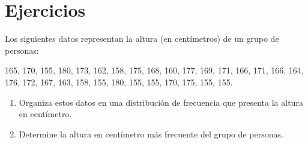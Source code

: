 \section{Ejercicios}

\begin{exercise}
    Los siguientes datos representan la altura (en centímetros) de un grupo de personas:
    
    165, 170, 155, 180, 173, 162, 158, 175, 168, 160, 177, 169, 171, 166, 171, 166, 164, 176, 172, 167, 163, 158, 155, 180, 155, 155, 170, 175, 155, 155.
    \begin{enumerate}
        \item Organiza estos datos en una distribución de frecuencia que presenta la altura en centímetro.
        \item Determine la altura en centímetro más frecuente del grupo de personas.
    \end{enumerate}
\end{exercise}
